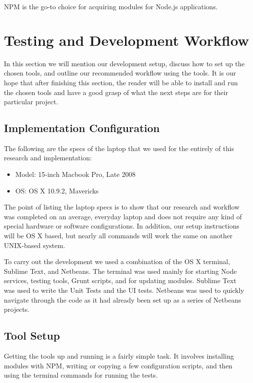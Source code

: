 \documentclass[12pt]{ucthesis}
\begin{document}
NPM is the go-to choice for acquiring modules for Node.js applications.

\chapter{Testing and Development Workflow}
In this section we will mention our development setup, discuss how to set up the chosen tools, and outline our recommended workflow using the tools. It is our hope that after finishing this section, the reader will be able to install and run the chosen tools and have a good grasp of what the next steps are for their particular project.

\section{Implementation Configuration}
The following are the specs of the laptop that we used for the entirely of this research and implementation:
\begin{itemize}
  \item Model: 15-inch Macbook Pro, Late 2008
  \item OS: OS X 10.9.2, Mavericks
\end{itemize}
The point of listing the laptop specs is to show that our research and workflow was completed on an average, everyday laptop and does not require any kind of special hardware or software configurations. In addition, our setup instructions will be OS X based, but nearly all commands will work the same on another UNIX-based system.

To carry out the development we used a combination of the OS X terminal, Sublime Text, and Netbeans. The terminal was used mainly for starting Node services, testing tools, Grunt scripts, and for updating modules. Sublime Text was used to write the Unit Tests and the UI tests. Netbeans was used to quickly navigate through the code as it had already been set up as a series of Netbeans projects.

\section{Tool Setup}
Getting the tools up and running is a fairly simple task. It involves installing modules with NPM, writing or copying a few configuration scripts, and then using the terminal commands for running the tests.
\end{document}
